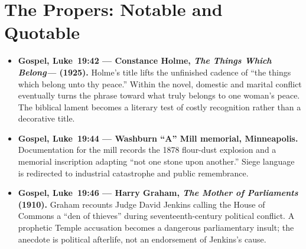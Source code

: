 \sectionguard
\section*{The Propers: Notable and Quotable}

{\small
\begin{itemize}[itemsep=0.35em,topsep=0.2em,parsep=0pt]
\item \textbf{Gospel, Luke~19:42 --- Constance Holme, \emph{The Things Which Belong---} (1925).} Holme's title lifts the unfinished cadence of ``the things which belong unto thy peace.'' Within the novel, domestic and marital conflict eventually turns the phrase toward what truly belongs to one woman's peace. The biblical lament becomes a literary test of costly recognition rather than a decorative title.

\item \textbf{Gospel, Luke~19:44 --- Washburn ``A'' Mill memorial, Minneapolis.} Documentation for the mill records the 1878 flour-dust explosion and a memorial inscription adapting ``not one stone upon another.'' Siege language is redirected to industrial catastrophe and public remembrance.

\item \textbf{Gospel, Luke~19:46 --- Harry Graham, \emph{The Mother of Parliaments} (1910).} Graham recounts Judge David Jenkins calling the House of Commons a ``den of thieves'' during seventeenth-century political conflict. A prophetic Temple accusation becomes a dangerous parliamentary insult; the anecdote is political afterlife, not an endorsement of Jenkins's cause.
\end{itemize}
}
